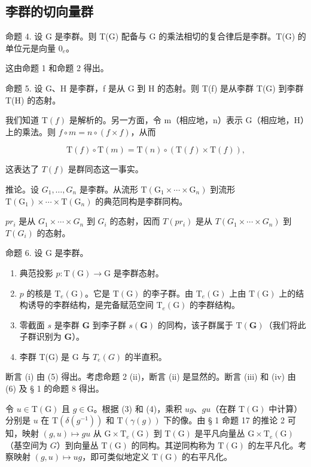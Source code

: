 \subsection{李群的切向量群}

命题 4. 设 G 是李群。则 T(G) 配备与 G 的乘法相切的复合律后是李群。T(G) 的单位元是向量 \(0_{e}\)。

这由命题 1 和命题 2 得出。

命题 5. 设 G、H 是李群，f 是从 G 到 H 的态射。则 T(f) 是从李群 T(G) 到李群 T(H) 的态射。

我们知道 \(\mathrm{T}(f)\) 是解析的。另一方面，令 m（相应地，n）表示 G（相应地，H）上的乘法。则 \(f \circ m = n \circ (f \times f)\)，从而

\[
\mathrm{T} (f) \circ \mathrm{T} (m) = \mathrm{T} (n) \circ (\mathrm{T} (f) \times \mathrm{T} (f)),
\]

这表达了 \(T(f)\) 是群同态这一事实。

推论。设 \(G_{1},\ldots,G_{n}\) 是李群。从流形 \(\mathrm{T}(\mathrm{G}_{1}\times\cdots\times\mathrm{G}_{n})\) 到流形 \(\mathrm{T}(\mathrm{G}_{1})\times\cdots\times\mathrm{T}(\mathrm{G}_{n})\) 的典范同构是李群同构。

\(pr_{i}\) 是从 \(G_{1} \times \cdots \times G_{n}\) 到 \(G_{i}\) 的态射，因而 \(T(pr_{i})\) 是从 \(T(G_{1} \times \cdots \times G_{n})\) 到 \(T(G_{i})\) 的态射。

命题 6. 设 G 是李群。

\begin{enumerate}
\def\labelenumi{(\roman{enumi})}
\item
  典范投影 \(p: \mathrm{T}(\mathrm{G}) \to \mathrm{G}\) 是李群态射。
\item
  \(p\) 的核是 \(\mathrm{T}_e(\mathrm{G})\)。它是 \(\mathrm{T}(\mathrm{G})\) 的李子群。由 \(\mathrm{T}_e(\mathrm{G})\) 上由 \(\mathrm{T}(\mathrm{G})\) 上的结构诱导的李群结构，是完备赋范空间 \(\mathrm{T}_e(\mathrm{G})\) 的李群结构。
\item
  零截面 \(s\) 是李群 \(\mathbf{G}\) 到李子群 \(s(\mathbf{G})\) 的同构，该子群属于 \(\mathrm{T}(\mathbf{G})\)（我们将此子群识别为 \(\mathbf{G}\)）。
\item
  李群 T(G) 是 G 与 \(T_{e}(G)\) 的半直积。
\end{enumerate}

断言 (i) 由 (5) 得出。考虑命题 2 (ii)，断言 (ii) 是显然的。断言 (iii) 和 (iv) 由 (6) 及 § 1 的命题 8 得出。

令 \(u \in \mathrm{T}(\mathrm{G})\) 且 \(g \in \mathrm{G}\)。根据 (3) 和 (4)，乘积 \(ug\)、\(gu\)（在群 \(\mathrm{T}(\mathrm{G})\) 中计算）分别是 \(u\) 在 \(\mathrm{T}(\delta(g^{-1}))\) 和 \(\mathrm{T}(\gamma(g))\) 下的像。由 § 1 命题 17 的推论 2 可知，映射 \((g, u) \mapsto gu\) 从 \(\mathrm{G} \times \mathrm{T}_e(\mathrm{G})\) 到 \(\mathrm{T}(\mathrm{G})\) 是平凡向量丛 \(\mathrm{G} \times \mathrm{T}_e(\mathrm{G})\)（基空间为 \(G\)）到向量丛 \(\mathrm{T}(\mathrm{G})\) 的同构。其逆同构称为 \(\mathrm{T}(\mathrm{G})\) 的左平凡化。考察映射 \((g, u) \mapsto ug\)，即可类似地定义 \(\mathrm{T}(\mathrm{G})\) 的右平凡化。

